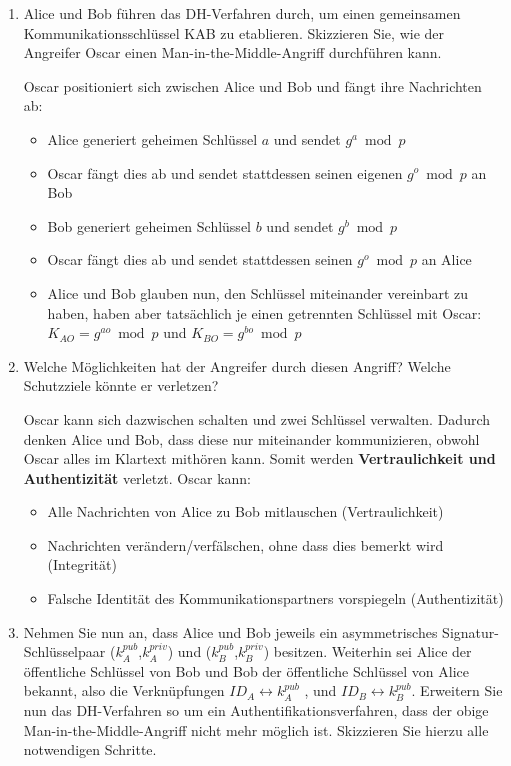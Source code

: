 \documentclass[a4paper]{article}
\begin{document}
\begin{enumerate}
    \item Alice und Bob führen das DH-Verfahren durch, um einen gemeinsamen Kommunikationsschlüssel KAB zu etablieren. Skizzieren Sie, wie der Angreifer Oscar einen Man-in-the-Middle-Angriff durchführen kann.
    
    Oscar positioniert sich zwischen Alice und Bob und fängt ihre Nachrichten ab:
    \begin{itemize}
        \item Alice generiert geheimen Schlüssel $a$ und sendet $g^a \bmod p$
        \item Oscar fängt dies ab und sendet stattdessen seinen eigenen $g^o \bmod p$ an Bob
        \item Bob generiert geheimen Schlüssel $b$ und sendet $g^b \bmod p$
        \item Oscar fängt dies ab und sendet stattdessen seinen $g^o \bmod p$ an Alice
        \item Alice und Bob glauben nun, den Schlüssel miteinander vereinbart zu haben, haben aber tatsächlich je einen getrennten Schlüssel mit Oscar: $K_{AO} = g^{ao} \bmod p$ und $K_{BO} = g^{bo} \bmod p$
    \end{itemize}

    \item Welche Möglichkeiten hat der Angreifer durch diesen Angriff? Welche Schutzziele könnte er verletzen?
    
    Oscar kann sich dazwischen schalten und zwei Schlüssel verwalten. Dadurch denken Alice und Bob, dass diese nur miteinander kommunizieren, obwohl Oscar alles im Klartext mithören kann. Somit werden \textbf{Vertraulichkeit und Authentizität} verletzt. Oscar kann:
    \begin{itemize}
        \item Alle Nachrichten von Alice zu Bob mitlauschen (Vertraulichkeit)
        \item Nachrichten verändern/verfälschen, ohne dass dies bemerkt wird (Integrität)
        \item Falsche Identität des Kommunikationspartners vorspiegeln (Authentizität)
    \end{itemize}
    
    \item Nehmen Sie nun an, dass Alice und Bob jeweils ein asymmetrisches Signatur-Schlüsselpaar ($k_A^{pub}$,$k_A^{priv}$) und ($k_B^{pub}$,$k_B^{priv}$) besitzen. Weiterhin sei Alice der öffentliche Schlüssel von Bob und Bob der öffentliche Schlüssel von Alice bekannt, also die Verknüpfungen $ID_A \leftrightarrow k_A^{pub}$ , und $ID_B \leftrightarrow k_B^{pub}$. Erweitern Sie nun das DH-Verfahren so um ein Authentifikationsverfahren, dass der obige Man-in-the-Middle-Angriff nicht mehr möglich ist. Skizzieren Sie hierzu alle notwendigen Schritte.
    

\end{enumerate}
\end{document}
